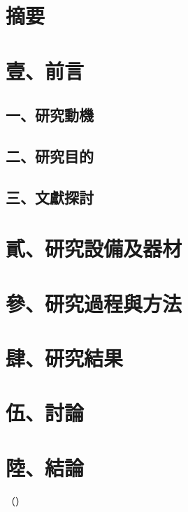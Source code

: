 \documentclass[12pt]{article}
\begin{document}
\section{摘要}

\section{壹、前言}

\subsection{一、研究動機}

\subsection{二、研究目的}

\subsection{三、文獻探討}

\section{貳、研究設備及器材}

\section{參、研究過程與方法}

\section{肆、研究結果}

\section{伍、討論}

\section{陸、結論}

（）
\end{document}
